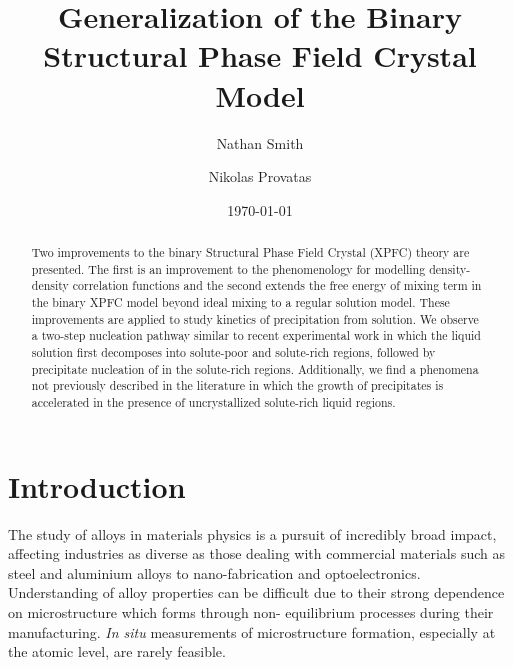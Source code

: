 \documentclass[showkeys, prb, reprint]{revtex4-1}
\begin{document}

\title{Generalization of the Binary Structural Phase Field Crystal Model}
\author{Nathan Smith}
\author{Nikolas Provatas}
\date{\today}

\begin{abstract}

Two improvements to the binary Structural Phase Field Crystal (XPFC) theory are
presented. The first is an improvement to the phenomenology for modelling density-density
correlation functions and the second extends the free energy of mixing term in
the binary XPFC model beyond ideal mixing to a regular solution model. These
improvements are applied to study kinetics of precipitation from solution. We
observe a two-step nucleation pathway similar to recent experimental work
\cite{LOH17, WALLACE13} in which the liquid solution first decomposes into solute-poor
and solute-rich regions, followed by precipitate nucleation of in the solute-rich regions.
Additionally, we find a phenomena not previously described in the literature in
which the growth of precipitates is accelerated in the presence of
uncrystallized solute-rich liquid regions.

\end{abstract}


\maketitle


\section{Introduction} %



The study of alloys in materials physics is a pursuit of incredibly broad impact, affecting industries as diverse as those dealing with commercial materials such as steel and aluminium alloys to nano-fabrication and
optoelectronics. Understanding of alloy properties can be difficult due to
their strong dependence on microstructure which forms through non- equilibrium
processes during their manufacturing. \textit{In situ} measurements of microstructure formation, especially at the atomic level, are rarely feasible.
\end{document}
